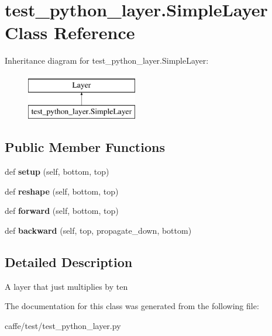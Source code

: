 \hypertarget{classtest__python__layer_1_1_simple_layer}{}\section{test\+\_\+python\+\_\+layer.\+Simple\+Layer Class Reference}
\label{classtest__python__layer_1_1_simple_layer}
Inheritance diagram for test\+\_\+python\+\_\+layer.\+Simple\+Layer\+:\begin{figure}[H]
\begin{center}
\leavevmode
\includegraphics[height=2.000000cm]{classtest__python__layer_1_1_simple_layer}
\end{center}
\end{figure}
\subsection*{Public Member Functions}
\begin{DoxyCompactItemize}
\item 
\hypertarget{classtest__python__layer_1_1_simple_layer_a771c50bd471ec42b45321da08356e0c1}{}def {\bfseries setup} (self, bottom, top)\label{classtest__python__layer_1_1_simple_layer_a771c50bd471ec42b45321da08356e0c1}

\item 
\hypertarget{classtest__python__layer_1_1_simple_layer_a7e92ab7e8cee5f59db80f0e043578ab7}{}def {\bfseries reshape} (self, bottom, top)\label{classtest__python__layer_1_1_simple_layer_a7e92ab7e8cee5f59db80f0e043578ab7}

\item 
\hypertarget{classtest__python__layer_1_1_simple_layer_ac2ed0d5bf9321df89f8e5f952955b2a0}{}def {\bfseries forward} (self, bottom, top)\label{classtest__python__layer_1_1_simple_layer_ac2ed0d5bf9321df89f8e5f952955b2a0}

\item 
\hypertarget{classtest__python__layer_1_1_simple_layer_a89f9105c5080d5677bd59e935b99eac7}{}def {\bfseries backward} (self, top, propagate\+\_\+down, bottom)\label{classtest__python__layer_1_1_simple_layer_a89f9105c5080d5677bd59e935b99eac7}

\end{DoxyCompactItemize}


\subsection{Detailed Description}
\begin{DoxyVerb}A layer that just multiplies by ten\end{DoxyVerb}
 

The documentation for this class was generated from the following file\+:\begin{DoxyCompactItemize}
\item 
caffe/test/test\+\_\+python\+\_\+layer.\+py\end{DoxyCompactItemize}
